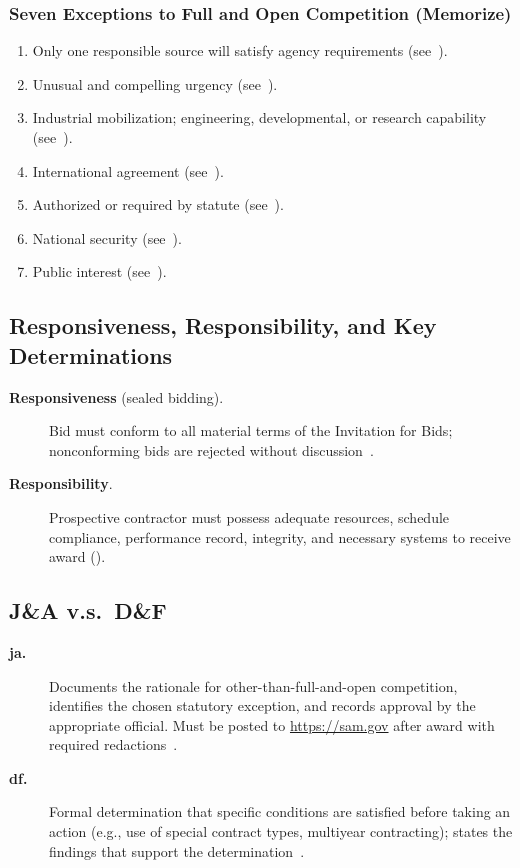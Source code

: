 \documentclass[../main.tex]{subfiles}
\begin{document}
\subsubsection{Seven Exceptions to Full and Open Competition (Memorize)}
\begin{enumerate}
	\item Only one responsible source will satisfy agency requirements (see~\autocite[\S~6.302-1]{FAR}).
	\item Unusual and compelling urgency (see~\autocite[\S~6.302-2]{FAR}).
	\item Industrial mobilization; engineering, developmental, or research capability (see~\autocite[\S~6.302-3]{FAR}).
	\item International agreement (see~\autocite[\S~6.302-4]{FAR}).
	\item Authorized or required by statute (see~\autocite[\S~6.302-5]{FAR}).
	\item National security (see~\autocite[\S~6.302-6]{FAR}).
	\item Public interest (see~\autocite[\S~6.302-7]{FAR}).
\end{enumerate}

\subsection{Responsiveness, Responsibility, and Key Determinations}
\begin{description}
	\item[\textbf{Responsiveness} (sealed bidding).] Bid must conform to all material terms of the Invitation for Bids; nonconforming bids are rejected without discussion~\autocite{FAR}.
	\item[\textbf{Responsibility}.] Prospective contractor must possess adequate resources, schedule compliance, performance record, integrity, and necessary systems to receive award (\autocite[\S~9.104]{FAR}).
\end{description}

\subsection{J\&A v.s.\ D\&F}
\begin{description}
	\item[\textbf{\ac{ja}.}] Documents the rationale for other-than-full-and-open competition, identifies the chosen statutory exception, and records approval by the appropriate official. Must be posted to \url{https://sam.gov} after award with required redactions~\autocite{FAR}.
	\item[\textbf{\ac{df}.}] Formal determination that specific conditions are satisfied before taking an action (e.g., use of special contract types, multiyear contracting); states the findings that support the determination~\autocite{FAR}.
\end{description}
\end{document}

